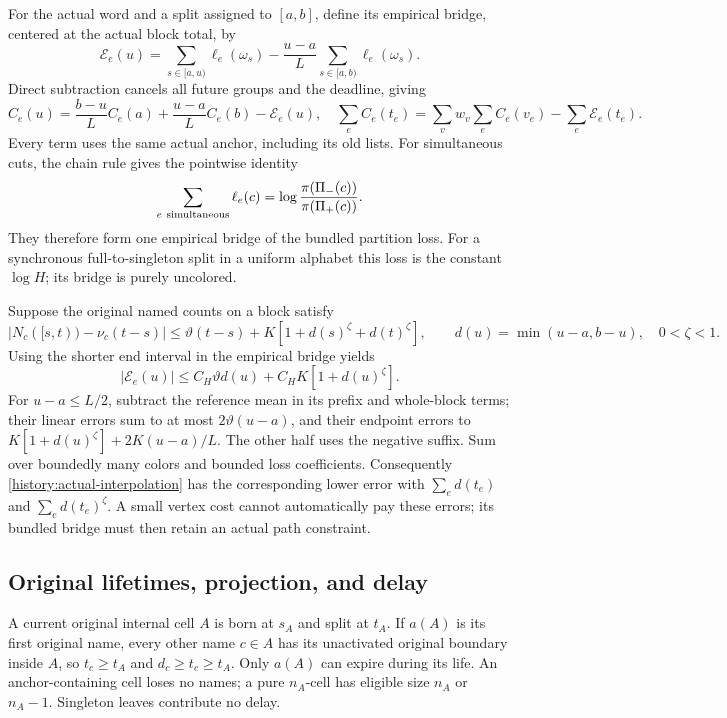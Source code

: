 For the actual word and a split assigned to $[a,b]$, define its empirical
bridge, centered at the actual block total, by
\[
 \mathcal E_e(u)=\sum_{s\in[a,u)}\ell_e(\omega_s)
       -\frac{u-a}{L}\sum_{s\in[a,b)}\ell_e(\omega_s).
\]
Direct subtraction cancels all future groups and the deadline, giving
\begin{equation}
 C_e(u)=\frac{b-u}{L}C_e(a)+\frac{u-a}{L}C_e(b)-\mathcal E_e(u),
 \quad
 \sum_eC_e(t_e)=\sum_vw_v\sum_eC_e(v_e)-\sum_e\mathcal E_e(t_e).
 \label{history:actual-interpolation}
\end{equation}
Every term uses the same actual anchor, including its old lists.
For simultaneous cuts, the chain rule gives the pointwise identity
\[
 \sum_{e\ {\rm simultaneous}}\ell_e(c)
   =\log\frac{\pi(\Pi_-(c))}{\pi(\Pi_+(c))}.
\]
They therefore form one empirical bridge of the bundled partition loss.
For a synchronous full-to-singleton split in a uniform alphabet this
loss is the constant $\log H$; its bridge is purely uncolored.

Suppose the original named counts on a block satisfy
\begin{equation}
 |N_c([s,t))-\nu_c(t-s)|
 \le\vartheta(t-s)+K[1+d(s)^\zeta+d(t)^\zeta],
 \qquad d(u)=\min(u-a,b-u),\quad0<\zeta<1.
 \label{history:named-REG}
\end{equation}
Using the shorter end interval in the empirical bridge yields
\begin{equation}
 |\mathcal E_e(u)|\le C_H\vartheta d(u)+C_HK[1+d(u)^\zeta].
 \label{history:bridge-REG}
\end{equation}
For $u-a\le L/2$, subtract the reference mean in its prefix and
whole-block terms; their linear errors sum to at most
$2\vartheta(u-a)$, and their endpoint errors to
$K[1+d(u)^\zeta]+2K(u-a)/L$. The other half uses the negative suffix.
Sum over boundedly many colors and bounded loss coefficients.
Consequently \eqref{history:actual-interpolation} has the corresponding
lower error with $\sum_ed(t_e)$ and $\sum_ed(t_e)^\zeta$.
A small vertex cost cannot automatically pay these errors; its bundled
bridge must then retain an actual path constraint.

\subsection{Original lifetimes, projection, and delay}

A current original internal cell $A$ is born at $s_A$ and split at
$t_A$. If $a(A)$ is its first original name, every other name $c\in A$
has its unactivated original boundary inside $A$, so
$t_c\ge t_A$ and $d_c\ge t_c\ge t_A$. Only $a(A)$ can expire
during its life. An anchor-containing cell loses no names; a pure
$n_A$-cell has eligible size $n_A$ or $n_A-1$. Singleton leaves
contribute no delay.


